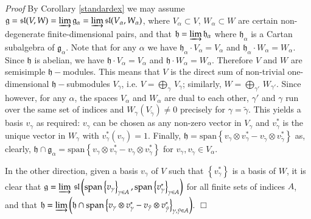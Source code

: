 \documentclass[10pt]{amsart}
\renewenvironment{proof}{ \emph{Proof}}{$\Box$}
\renewcommand{\sl}{\mathfrak{sl}}
\newcommand{\hh}{\mathfrak{h}}
\renewcommand{\gg}{\mathfrak{g}}
\renewcommand{\span}{\mathrm{span}}
\begin{document}
\begin{proof}
By Corollary \ref{standardex} we may assume $\gg=\sl(V,W)=\varinjlim
\gg_\alpha=\varinjlim\sl(V_\alpha, W_\alpha)$, 
where $V_\alpha \subset V$, $W_\alpha \subset W$ 
are certain non-degenerate finite-dimensional pairs, and that
$\hh=\varinjlim \hh_\alpha$ where $\hh_\alpha$ is a 
Cartan subalgebra of $\gg_\alpha$. Note that
for any $\alpha$ we have $\hh_\alpha\cdot V_\alpha=V_\alpha$ and  $\hh_\alpha\cdot  W_\alpha=W_\alpha$. Since $\hh$ is abelian, we have $\hh\cdot V_\alpha=V_\alpha$ and 
$\hh\cdot W_\alpha=W_\alpha$. Therefore $V$ and $W$ are semisimple $\hh-$modules.
This means that $V$ is the direct sum of non-trivial one-dimensional
$\hh-$submodules $V_\gamma$, i.e. 
$V=\bigoplus_\gamma\,V_\gamma$; similarly, 
$W = \bigoplus_{\gamma'}\,W_{\gamma'}$. 
Since however, for any $\alpha$, the spaces $V_{\alpha}$ and $W_{\alpha}$ are dual to each other, 
$\gamma'$ and $\gamma$ run over the same set of indices and
$W_\gamma(V_{\tilde\gamma}) \neq 0$ precisely for 
$\gamma = \tilde{\gamma}$. 
This yields a basis $v_\gamma$ as required: $v_\gamma$ can be chosen
as any non-zero vector in $V_\gamma$ and 
$v^*_{\gamma}$ is the unique vector in 
$W_{\gamma}$ with $v_{\gamma}^*(v_{\gamma})= 1$. 
Finally, 
$\hh = \span\left\lbrace v_\gamma \otimes v_\gamma^* - v_{\tilde\gamma} \otimes v_{\tilde\gamma}^*\right\rbrace$ as, clearly, 
$\hh\cap\gg_{\alpha}=\span\left\lbrace v_\gamma \otimes v_\gamma^* -v_{\tilde\gamma} \otimes v_{\tilde\gamma}^*\right\rbrace$ 
for $v_\gamma, v_{\tilde\gamma}\in V_\alpha$.

In the other direction, given a basis $v_\gamma$ of $V$ such that $\left\lbrace v_\gamma^* \right\rbrace$ is a basis of $W$, it is clear that 
$\gg = \varinjlim\,\sl\left(\span\left\lbrace v_\gamma\right\rbrace_{\gamma \in A}, \span\left\lbrace
v_\gamma^*\right\rbrace_{\gamma \in A}\right)$ 
for all 
finite sets of indices $A$, and that 
$\hh = \varinjlim \left(\hh \cap \span\left\lbrace v_{\gamma} \otimes v_\gamma^* - v_{\tilde\gamma} \otimes v_{\tilde\gamma}^*\right\rbrace_{\gamma,\tilde\gamma \in A}\right)$.
\end{proof}
\end{document}
